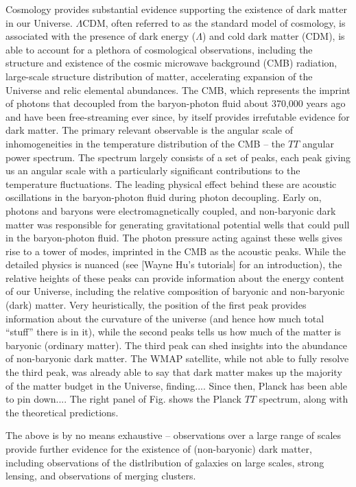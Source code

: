 Cosmology provides substantial evidence supporting the existence of dark matter in our Universe. $\Lambda$CDM, often referred to as the standard model of cosmology, is associated with the presence of dark energy ($\Lambda$) and cold dark matter (CDM), is able to account for a plethora of cosmological observations, including the structure and existence of the cosmic microwave background (CMB) radiation, large-scale structure distribution of matter, accelerating expansion of the Universe and relic elemental abundances. The CMB, which represents the imprint of photons that decoupled from the baryon-photon fluid about 370,000 years ago and have been free-streaming ever since, by itself provides irrefutable evidence for dark matter. The primary relevant observable is the angular scale of inhomogeneities in the temperature distribution of the CMB -- the $TT$ angular power spectrum. The spectrum largely consists of a set of peaks, each peak giving us an angular scale with a particularly significant contributions to the temperature fluctuations. The leading physical effect behind these are acoustic oscillations in the baryon-photon fluid during photon decoupling. Early on, photons and baryons were electromagnetically coupled, and non-baryonic dark matter was responsible for generating gravitational potential wells that could pull in the baryon-photon fluid. The photon pressure acting against these wells gives rise to a tower of modes, imprinted in the CMB as the acoustic peaks. While the detailed physics is nuanced (see [Wayne Hu's tutorials] for an introduction), the relative heights of these peaks can provide information about the energy content of our Universe, including the relative composition of baryonic and non-baryonic (dark) matter. Very heuristically, the position of the first peak provides information about the curvature of the universe (and hence how much total ``stuff'' there is in it), while the second peaks tells us how much of the matter is baryonic (ordinary matter). The third peak can shed insights into the abundance of non-baryonic dark matter. The WMAP satellite, while not able to fully resolve the third peak, was already able to say that dark matter makes up the majority of the matter budget in the Universe, finding.... Since then, Planck has been able to pin down.... The right panel of Fig. shows the Planck $TT$ spectrum, along with the theoretical predictions.

The above is by no means exhaustive -- observations over a large range of scales provide further evidence for the existence of (non-baryonic) dark matter, including observations of the distlribution of galaxies on large scales, strong lensing, and observations of merging clusters.

